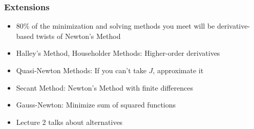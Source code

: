 \documentclass{beamer}
\begin{document}
\begin{frame}
\frametitle[alignment=center]{Extensions}
\begin{itemize}
\item 80\% of the minimization and solving methods you meet will be derivative-based twists of Newton's Method
\bigskip
\item Halley's Method, Householder Methods: Higher-order derivatives
\bigskip
\item Quasi-Newton Methods: If you can't take $J$, approximate it
\bigskip
\item Secant Method: Newton's Method with finite differences
\bigskip
\item Gauss-Newton: Minimize sum of squared functions
\bigskip
\item Lecture 2 talks about alternatives
\end{itemize}
\end{frame}
\end{document}
